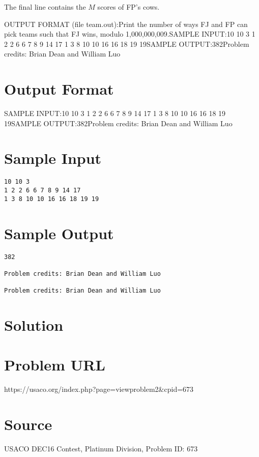\documentclass[12pt]{article}
\begin{document}
The final line contains the $M$ scores of FP's cows.

OUTPUT FORMAT (file team.out):Print the number of ways FJ and FP can pick teams such that FJ wins, modulo
1,000,000,009.SAMPLE INPUT:10 10 3
1 2 2 6 6 7 8 9 14 17
1 3 8 10 10 16 16 18 19 19SAMPLE OUTPUT:382Problem credits: Brian Dean and William Luo

\section*{Output Format}
SAMPLE INPUT:10 10 3
1 2 2 6 6 7 8 9 14 17
1 3 8 10 10 16 16 18 19 19SAMPLE OUTPUT:382Problem credits: Brian Dean and William Luo

\section*{Sample Input}
\begin{verbatim}
10 10 3
1 2 2 6 6 7 8 9 14 17
1 3 8 10 10 16 16 18 19 19
\end{verbatim}

\section*{Sample Output}
\begin{verbatim}
382

Problem credits: Brian Dean and William Luo

Problem credits: Brian Dean and William Luo
\end{verbatim}

\section*{Solution}


\section*{Problem URL}
https://usaco.org/index.php?page=viewproblem2&cpid=673

\section*{Source}
USACO DEC16 Contest, Platinum Division, Problem ID: 673
\end{document}
